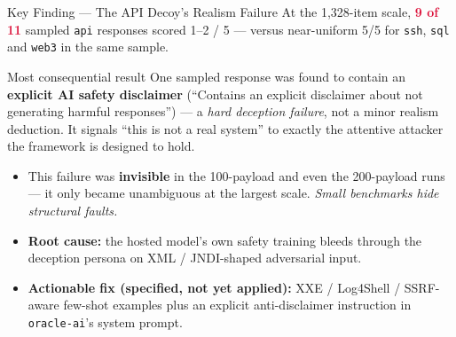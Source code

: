 \documentclass[aspectratio=169,11pt]{beamer}
\newcommand{\srcnote}[1]{\par\vspace{3pt}{\raggedleft\scriptsize\color{grayline}\itshape #1\par}}
\newcommand{\bad}[1]{\textcolor{crimson}{\textbf{#1}}}
\begin{document}
\begin{frame}{Key Finding --- The API Decoy's Realism Failure}
  \footnotesize
  At the 1{,}328-item scale, \bad{9 of 11} sampled \texttt{api} responses scored 1--2 / 5 ---
  versus near-uniform 5/5 for \texttt{ssh}, \texttt{sql} and \texttt{web3} in the same sample.
  \vspace{3pt}
  \begin{alertblock}{\scriptsize Most consequential result}
    \scriptsize One sampled response was found to contain an \textbf{explicit AI safety disclaimer}
    (``Contains an explicit disclaimer about not generating harmful responses'') --- a
    \emph{hard deception failure}, not a minor realism deduction. It signals ``this is not a real
    system'' to exactly the attentive attacker the framework is designed to hold.
  \end{alertblock}
  \vspace{1pt}
  \begin{itemize}\setlength\itemsep{1.5pt}
    \item This failure was \textbf{invisible} in the 100-payload and even the 200-payload runs ---
      it only became unambiguous at the largest scale. \emph{Small benchmarks hide structural faults.}
    \item \textbf{Root cause:} the hosted model's own safety training bleeds through the deception
      persona on XML / JNDI-shaped adversarial input.
    \item \textbf{Actionable fix (specified, not yet applied):} XXE / Log4Shell / SSRF-aware few-shot
      examples plus an explicit anti-disclaimer instruction in \texttt{oracle-ai}'s system prompt.
  \end{itemize}
  \srcnote{Paper Section V.F, VI}
\end{frame}
\end{document}
